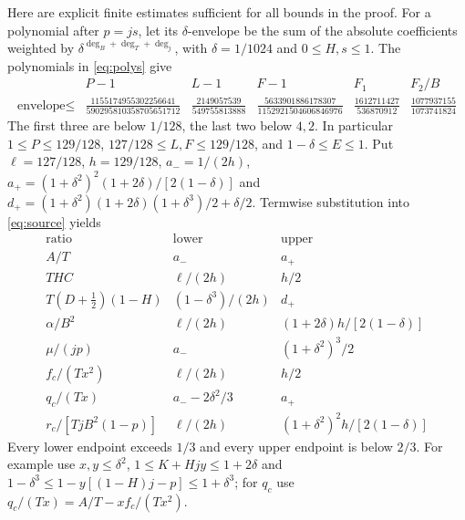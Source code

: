 \documentclass[10pt]{article}
\newcommand{\half}{\tfrac12}
\begin{document}
Here are explicit finite estimates sufficient for all bounds in the proof.
For a polynomial after $p=js$, let its $\delta$-envelope be the sum of the
absolute coefficients weighted by
$\delta^{\deg_B+\deg_T+\deg_j}$, with $\delta=1/1024$ and $0\leq H,s\leq1$.
The polynomials in \eqref{eq:polys} give
\begin{equation}
\begin{array}{c|ccccc}
 &P-1&L-1&F-1&F_1&F_2/B\\ \hline
\text{envelope}\leq&
\frac{1155174955302256641}{590295810358705651712}&
\frac{2149057539}{549755813888}&
\frac{5633901886178307}{1152921504606846976}&
\frac{1612711427}{536870912}&
\frac{1077937155}{1073741824}
\end{array}\label{eq:envelopes}
\end{equation}
The first three are below $1/128$, the last two below $4,2$.
In particular $1\leq P\leq129/128$, $127/128\leq L,F\leq129/128$,
and $1-\delta\leq E\leq1$.
Put $\ell=127/128$, $h=129/128$,
$a_-=1/(2h)$,
$a_+=(1+\delta^2)^2(1+2\delta)/[2(1-\delta)]$ and
$d_+=(1+\delta^2)(1+2\delta)(1+\delta^3)/2+\delta/2$.
Termwise substitution into \eqref{eq:source} yields
\begin{equation}
\begin{array}{c|cc}
\text{ratio}&\text{lower}&\text{upper}\\ \hline
 A/T&a_-&a_+\\
 THC&\ell/(2h)&h/2\\
 T(D+\half)(1-H)&(1-\delta^3)/(2h)&d_+\\
 \alpha/B^2&\ell/(2h)&(1+2\delta)h/[2(1-\delta)]\\
 \mu/(jp)&a_-&(1+\delta^2)^3/2\\
 f_c/(Tx^2)&\ell/(2h)&h/2\\
 q_c/(Tx)&a_--2\delta^2/3&a_+\\
 r_c/[TjB^2(1-p)]&\ell/(2h)&(1+\delta^2)^2h/[2(1-\delta)]
\end{array}\label{eq:ratiotable}
\end{equation}
Every lower endpoint exceeds $1/3$ and every upper endpoint is below $2/3$.
For example use $x,y\leq\delta^2$,
$1\leq K+Hjy\leq1+2\delta$ and
$1-\delta^3\leq1-y[(1-H)j-p]\leq1+\delta^3$;
for $q_c$ use $q_c/(Tx)=A/T-xf_c/(Tx^2)$.
\end{document}
